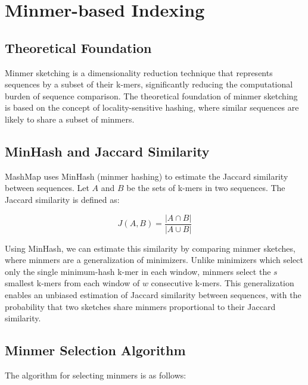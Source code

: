 \documentclass{article}
\begin{document}
\section{Minmer-based Indexing}

\subsection{Theoretical Foundation}

Minmer sketching is a dimensionality reduction technique that represents sequences by a subset of their k-mers, significantly reducing the computational burden of sequence comparison. The theoretical foundation of minmer sketching is based on the concept of locality-sensitive hashing, where similar sequences are likely to share a subset of minmers.

\subsection{MinHash and Jaccard Similarity}

MashMap uses MinHash (minmer hashing) to estimate the Jaccard similarity between sequences. Let \(A\) and \(B\) be the sets of k-mers in two sequences. The Jaccard similarity is defined as:

\begin{equation}
J(A, B) = \frac{|A \cap B|}{|A \cup B|}
\end{equation}

Using MinHash, we can estimate this similarity by comparing minmer sketches, where minmers are a generalization of minimizers. Unlike minimizers which select only the single minimum-hash k-mer in each window, minmers select the \(s\) smallest k-mers from each window of \(w\) consecutive k-mers. This generalization enables an unbiased estimation of Jaccard similarity between sequences, with the probability that two sketches share minmers proportional to their Jaccard similarity.

\subsection{Minmer Selection Algorithm}

The algorithm for selecting minmers is as follows:
\end{document}
